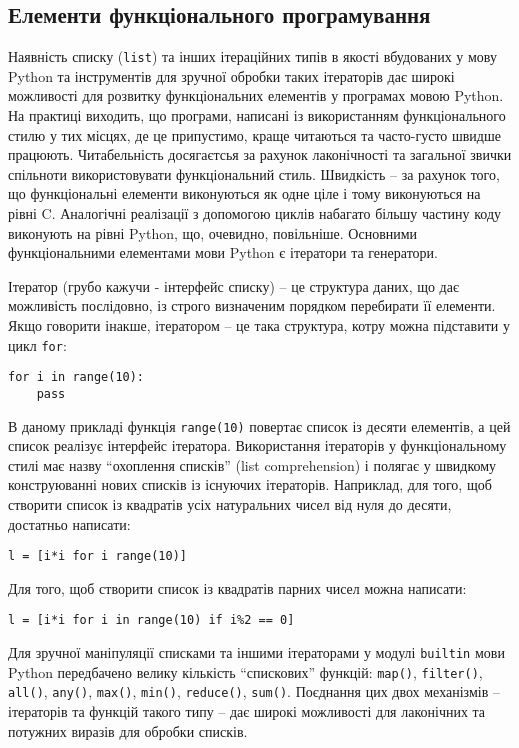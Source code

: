 \documentclass[a4paper, 12pt, onsedie]{article}
\begin{document}
\subsection{Елементи функціонального програмування}
Наявність списку (\texttt{list}) та інших ітераційних типів в якості вбудованих
у мову Python та інструментів для зручної обробки таких ітераторів дає широкі можливості
для розвитку функціональних елементів у програмах мовою Python. На практиці виходить, що
програми, написані із використанням функціонального стилю у тих місцях, де це припустимо,
краще читаються та часто-густо швидше працюють. Читабельність досягаєтсья за рахунок
лаконічності та загальної звички спільноти використовувати функціональний стиль. Швидкість
-- за рахунок того, що функціональні елементи виконуються як одне ціле і тому виконуються
на рівні C. Аналогічні реалізації з допомогою циклів набагато більшу частину коду
виконують на рівні Python, що, очевидно, повільніше. Основними функціональними елементами
мови Python є ітератори та генератори.

Ітератор (грубо кажучи - інтерфейс списку) -- це структура даних, що дає можливість 
послідовно, із строго визначеним порядком перебирати її елементи. Якщо говорити інакше,
ітератором -- це така структура, котру можна підставити у цикл \texttt{for}:

\begin{verbatim}
for i in range(10):
    pass
\end{verbatim}
В даному прикладі функція \texttt{range(10)} повертає список із десяти елементів, а цей
список реалізує інтерфейс ітератора. Використання ітераторів у функціональному стилі має
назву ``охоплення списків'' (list comprehension) і полягає у швидкому конструюванні нових
списків із існуючих ітераторів. Наприклад, для того, щоб створити список із квадратів 
усіх натуральних чисел від нуля до десяти, достатньо написати:

\begin{verbatim}
l = [i*i for i range(10)]
\end{verbatim}
Для того, щоб створити список із квадратів парних чисел можна написати:
\begin{verbatim}
l = [i*i for i in range(10) if i%2 == 0]
\end{verbatim}

Для зручної маніпуляції списками та іншими ітераторами у модулі 
\texttt{\textunderscore \textunderscore builtin\textunderscore \textunderscore }
мови Python передбачено велику кількість ``спискових'' функцій: \texttt{map()}, 
\texttt{filter()}, \texttt{all()}, \texttt{any()}, \texttt{max()}, \texttt{min()},
\texttt{reduce()}, \texttt{sum()}. Поєднання цих двох механізмів -- ітераторів
та функцій такого типу -- дає широкі можливості для лаконічних та потужних
виразів для обробки списків.
\end{document}
